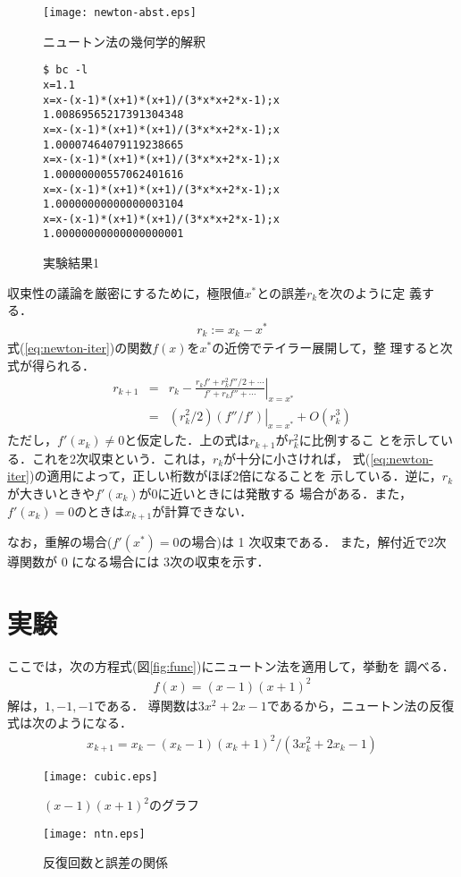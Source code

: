 \documentclass[12pt]{jarticle}
\newcommand \Br [1] {\left( #1 \right)}
\renewcommand  \[  {\begin{eqnarray}}
\renewcommand  \]  {\end{eqnarray}}
\begin{document}
\begin{figure}[t]
 \begin{minipage}{7.95cm}
  \center
  \texttt{[image: newton-abst.eps]}
  \caption{ニュートン法の幾何学的解釈}
  \label{fig:fig1}
 \end{minipage}
 \begin{minipage}{7.95cm}
  \center
  \small
\begin{verbatim}
$ bc -l
x=1.1
x=x-(x-1)*(x+1)*(x+1)/(3*x*x+2*x-1);x
1.00869565217391304348
x=x-(x-1)*(x+1)*(x+1)/(3*x*x+2*x-1);x
1.00007464079119238665
x=x-(x-1)*(x+1)*(x+1)/(3*x*x+2*x-1);x
1.00000000557062401616
x=x-(x-1)*(x+1)*(x+1)/(3*x*x+2*x-1);x
1.00000000000000003104
x=x-(x-1)*(x+1)*(x+1)/(3*x*x+2*x-1);x
1.00000000000000000001
\end{verbatim}
  \caption{実験結果1}
  \label{fig:fig2}
 \end{minipage}
\end{figure}

収束性の議論を厳密にするために，極限値$x^*$との誤差$r_k$を次のように定
義する．
\[
\label{eq:deferr}
r_k := x_k - x^*
\]
式(\ref{eq:newton-iter})の関数$f(x)$を$x^*$の近傍でテイラー展開して，整
理すると次式が得られる\cite{numeric}．
\[
\nonumber
 r_{k+1} &=& r_k - \left. \frac{r_k f'+ r_k^2 f''/2 + \cdots}{f'+ r_k f'' + \cdots} \right|_{x=x^*}
\label{eq:quadra}
\\      &=& \left. \Br{r_k^2/2} \Br{f''/f'} \right|_{x=x^*} + O(r_k^3)
\]
ただし，$f'(x_k)\ne0$と仮定した．上の式は$r_{k+1}$が$r_k^2$に比例するこ
とを示している．これを2次収束という．これは，$r_k$が十分に小さければ，
式(\ref{eq:newton-iter})の適用によって，正しい桁数がほぼ2倍になることを
示している．逆に，$r_k$が大きいときや$f'(x_k)$が0に近いときには発散する
場合がある．また，$f'(x_k)=0$のときは$x_{k+1}$が計算できない．

なお，重解の場合($f'(x^*)=0$の場合)は 1 次収束である．
また，解付近で2次導関数が 0 になる場合には 3次の収束を示す．


\section{実験}
\label{sec:exp}

ここでは，次の方程式(図\ref{fig:func})にニュートン法を適用して，挙動を
調べる．
\[
f(x)=(x-1)(x+1)^2
\]
解は，$1,-1,-1$である．
導関数は$3x^2+2x-1$であるから，ニュートン法の反復式は次のようになる．
\[
\label{eq:iter}
x_{k+1}=x_k-(x_k-1)(x_k+1)^2/(3x_k^2+2x_k-1)
\]

\begin{figure}[t]
 \begin{minipage}{7.95cm}
  \center
  \texttt{[image: cubic.eps]}
  \caption{$(x-1)(x+1)^2$のグラフ}
  \label{fig:func}
 \end{minipage}
 \begin{minipage}{7.95cm}
  \center
  \texttt{[image: ntn.eps]}
  \caption{反復回数と誤差の関係}
  \label{fig:fig4}
 \end{minipage}
\end{figure}
\end{document}

